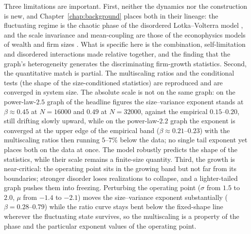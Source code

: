 Three limitations are important. First, neither the dynamics nor the construction is new,
and Chapter~\ref{chap:background} places both in their lineage: the fluctuating
regime is the chaotic phase of the disordered Lotka--Volterra model \citep{diederich1989,bunin2017,galla2018,roy2020},
and the scale invariance and mean-coupling are those of the econophysics models of wealth and
firm sizes \citep{bouchaudmezard2000,malcai2002}. What is
specific here is the combination, self-limitation and disordered interactions made relative
together, and the finding that the graph's heterogeneity generates the discriminating
firm-growth statistics. Second,
the quantitative match is partial. The
multiscaling ratios and the conditional tests (the shape of the size-conditioned
statistics) are reproduced and are converged in system size. The absolute scale is
not on the same graph: on the power-law-$2.5$ graph of the headline figures the
size--variance exponent stands at $\beta \approx 0.45$ at $N = 16000$ and
$0.49$ at $N = 32000$,
against the empirical $0.15$--$0.20$, still drifting slowly upward, while on the
power-law-$2.2$ graph the exponent is converged at the upper edge of the empirical band
($\beta \approx 0.21$--$0.23$) with the multiscaling ratios then running
$5$--$7\%$ below the data; no single tail exponent yet places both on the data at
once. The model robustly predicts the shape of the statistics, while their scale remains a finite-size
quantity. Third,
the growth is near-critical: the operating point sits in the growing band but not far
from its boundaries; stronger disorder loses realizations to collapse, and a
lighter-tailed graph pushes them into freezing. Perturbing the operating point
($\sigma$ from $1.5$ to $2.0$, $\mu$ from $-1.4$ to $-2.1$) moves the size--variance
exponent substantially ($\beta = 0.28$--$0.79$) while the ratio curve stays bent below
the fixed-shape line wherever the fluctuating state survives, so the multiscaling is a
property of the phase and the particular exponent values of the operating point.

